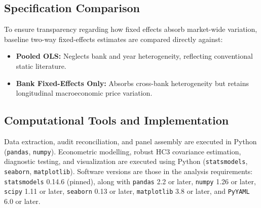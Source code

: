 \subsection{Specification Comparison}
To ensure transparency regarding how fixed effects absorb market-wide variation, baseline two-way fixed-effects estimates are compared directly against:
\begin{itemize}
    \item \textbf{Pooled OLS:} Neglects bank and year heterogeneity, reflecting conventional static literature.
    \item \textbf{Bank Fixed-Effects Only:} Absorbs cross-bank heterogeneity but retains longitudinal macroeconomic price variation.
\end{itemize}

\subsection{Computational Tools and Implementation}
Data extraction, audit reconciliation, and panel assembly are executed in Python (\texttt{pandas}, \texttt{numpy}). Econometric modelling, robust HC3 covariance estimation, diagnostic testing, and visualization are executed using Python (\texttt{statsmodels}, \texttt{seaborn}, \texttt{matplotlib}). Software versions are those in the analysis requirements: \texttt{statsmodels} 0.14.6 (pinned), along with \texttt{pandas} 2.2 or later, \texttt{numpy} 1.26 or later, \texttt{scipy} 1.11 or later, \texttt{seaborn} 0.13 or later, \texttt{matplotlib} 3.8 or later, and \texttt{PyYAML} 6.0 or later.

